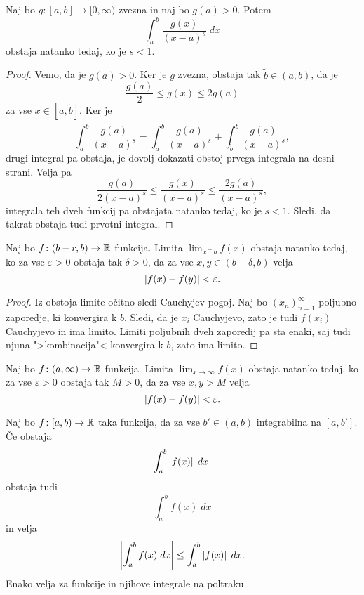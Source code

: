 \documentclass[12pt, a4paper]{article}
\begin{document}
\obvs

\begin{trditev}
Naj bo $g\colon[a,b]\to[0,\infty)$ zvezna in naj bo $g(a)>0$. Potem
\[
\int_a^b \frac{g(x)}{(x-a)^s}\;dx
\]
obstaja natanko tedaj, ko je $s<1$.
\end{trditev}

\begin{proof}
Vemo, da je $g(a)>0$. Ker je $g$ zvezna, obstaja tak $\widetilde{b}\in(a,b)$, da je
\[
\frac{g(a)}{2}\leq g(x)\leq 2g(a)
\]
za vse $x\in[a,\widetilde{b}]$. Ker je
\[
\int_a^b\frac{g(a)}{(x-a)^s}=\int_a^{\widetilde{b}}\frac{g(a)}{(x-a)^s}+\int_{\widetilde{b}}^b\frac{g(a)}{(x-a)^s},
\]
drugi integral pa obstaja, je dovolj dokazati obstoj prvega integrala na desni strani. Velja pa
\[
\frac{g(a)}{2(x-a)^s}\leq\frac{g(x)}{(x-a)^s}\leq\frac{2g(a)}{(x-a)^s},
\]
integrala teh dveh funkcij pa obstajata natanko tedaj, ko je $s<1$. Sledi, da takrat obstaja tudi prvotni integral.
\end{proof}

\begin{trditev}
Naj bo $f\colon(b-r,b)\to\mathbb{R}$ funkcija. Limita $\displaystyle\lim_{x\uparrow b} f(x)$ obstaja natanko tedaj, ko za vse $\varepsilon>0$ obstaja tak $\delta>0$, da za vse $x,y\in(b-\delta, b)$ velja
\[
\left\lvert f(x)-f(y)\right\rvert<\varepsilon.
\]
\end{trditev}

\begin{proof}
Iz obstoja limite očitno sledi Cauchyjev pogoj. Naj bo $(x_n)_{n=1}^\infty$ poljubno zaporedje, ki konvergira k $b$. Sledi, da je $x_i$ Cauchyjevo, zato je tudi $f(x_i)$ Cauchyjevo in ima limito. Limiti poljubnih dveh zaporedij pa sta enaki, saj tudi njuna ">kombinacija"< konvergira k $b$, zato ima limito.
\end{proof}

\begin{trditev}
Naj bo $f\colon(a,\infty)\to\mathbb{R}$ funkcija. Limita $\displaystyle\lim_{x\to\infty} f(x)$ obstaja natanko tedaj, ko za vse $\varepsilon>0$ obstaja tak $M>0$, da za vse $x,y>M$ velja
\[
\left\lvert f(x)-f(y)\right\rvert<\varepsilon.
\]
\end{trditev}

\begin{trditev}
Naj bo $f\colon[a,b)\to\mathbb{R}$ taka funkcija, da za vse $b'\in(a,b)$ integrabilna na $[a,b']$. Če obstaja
\[
\int_a^b\left\lvert f(x)\right\rvert\;dx,
\]
obstaja tudi
\[
\int_a^b f(x)\;dx
\]
in velja
\[
\left\lvert \int_a^b f(x)\;dx\right\rvert\leq \int_a^b\left\lvert f(x)\right\rvert\;dx.
\]
Enako velja za funkcije in njihove integrale na poltraku.
\end{trditev}
\end{document}
